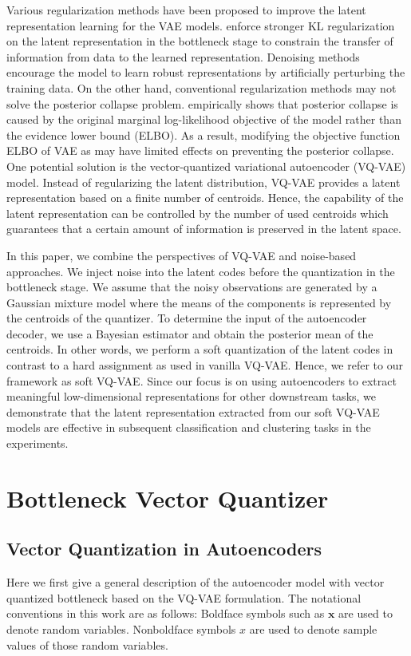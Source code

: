 \documentclass[letterpaper]{article} %
\begin{document}
Various regularization methods have been proposed to improve the latent representation learning for the VAE models. \cite{Higgins:17:iclr}\cite{burgess2018understanding} enforce stronger KL regularization on the latent representation in the bottleneck stage to constrain the transfer of information from data to the learned representation. Denoising methods \cite{8253482}\cite{NIPS2018_7692}\cite{bengio:AAAI:17} encourage the model to learn robust representations by artificially perturbing the training data. On the other hand, conventional regularization methods may not solve the posterior collapse problem. \cite{Lucas2019} empirically shows that posterior collapse is caused by the original marginal log-likelihood objective of the model rather than the evidence lower bound (ELBO). As a result, modifying the objective function ELBO of VAE as \cite{Higgins:17:iclr}\cite{burgess2018understanding} may have limited effects on preventing the posterior collapse. One potential solution is the vector-quantized variational autoencoder (VQ-VAE) \cite{oord:17:nips} model. Instead of regularizing the latent distribution, VQ-VAE provides a latent representation based on a finite number of centroids. Hence, the capability of the latent representation can be controlled by the number of used centroids which guarantees that a certain amount of information is preserved in the latent space.

In this paper, we combine the perspectives of VQ-VAE and noise-based approaches. We inject noise into the latent codes before the quantization in the bottleneck stage. We assume that the noisy observations are generated by a Gaussian mixture model where the means of the components is represented by the centroids of the quantizer. To determine the input of the autoencoder decoder, we use a Bayesian estimator and obtain the posterior mean of the centroids. In other words, we perform a soft quantization of the latent codes in contrast to a hard assignment as used in vanilla VQ-VAE. Hence, we refer to our framework as soft VQ-VAE. Since our focus is on using autoencoders to extract meaningful low-dimensional representations for other downstream tasks, we demonstrate that the latent representation extracted from our soft VQ-VAE models are effective in subsequent classification and clustering tasks in the experiments.
\section{Bottleneck Vector Quantizer}
\label{quantization}
\subsection{Vector Quantization in Autoencoders}
\label{subsec:vq-vae}
Here we first give a general description of the autoencoder model with vector quantized bottleneck based on the VQ-VAE formulation. The notational conventions in this work are as follows: Boldface symbols such as $\mathbf{x}$ are used to denote random variables. Nonboldface symbols $x$ are used to denote sample values of those random variables.
\end{document}
